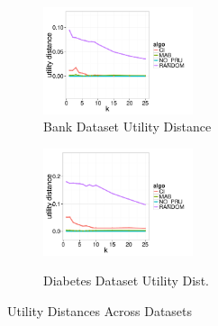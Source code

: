 \begin{figure}[h]
	\centering
	\vspace*{-10pt}
	\begin{subfigure}{0.48\linewidth}
		\centering
		\includegraphics[width=4.4cm] {Images/in_memory_bank_utility_dist.pdf}
		\vspace{-15pt}
		\caption{Bank Dataset Utility Distance}
		\label{fig:bank_utility_dist}
	\end{subfigure}
	\begin{subfigure}{0.48\linewidth}
		\centering
		\includegraphics[width=4.4cm] {Images/in_memory_dia_utility_dist.pdf}\
		\vspace{-15pt}
		\caption{Diabetes Dataset Utility Dist.}
		\label{fig:dia_utility_dist}
	\end{subfigure}
	\vspace{-10pt}
	\caption{Utility Distances Across Datasets}
	\vspace{-10pt}
\end{figure}







